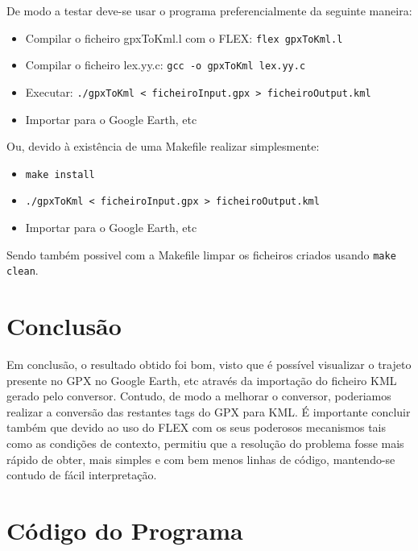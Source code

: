 \documentclass{llncs}
\begin{document}
De modo a testar deve-se usar o programa preferencialmente da seguinte maneira:
\begin{itemize}
    \item Compilar o ficheiro gpxToKml.l com o FLEX: \verb|flex gpxToKml.l|
    \item Compilar o ficheiro lex.yy.c: \verb|gcc -o gpxToKml lex.yy.c|
    \item Executar: \verb|./gpxToKml < ficheiroInput.gpx > ficheiroOutput.kml|
    \item Importar para o Google Earth, etc
\end{itemize}

Ou, devido à existência de uma Makefile realizar simplesmente:
\begin{itemize}
    \item \verb|make install|
    \item \verb|./gpxToKml < ficheiroInput.gpx > ficheiroOutput.kml|
    \item Importar para o Google Earth, etc
\end{itemize}

Sendo também possivel com a Makefile limpar os ficheiros criados usando \verb|make clean|.

\section{Conclusão}
Em conclusão, o resultado obtido foi bom, visto que é possível visualizar o trajeto presente no GPX no Google Earth, etc através da importação do ficheiro KML gerado pelo conversor. Contudo, de modo a melhorar o conversor, poderiamos realizar a conversão das restantes tags do GPX para KML. É importante concluir também que devido ao uso do FLEX com os seus poderosos mecanismos tais como as condições de contexto, permitiu que a resolução do problema fosse mais rápido de obter, mais simples e com bem menos linhas de código, mantendo-se contudo de fácil interpretação.

\appendix
\section{Código do Programa}
\end{document}
